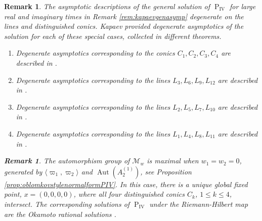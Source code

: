 \documentclass[a4paper,reqno]{amsart}
\numberwithin{equation}{section}
\newcommand{\pain}[1]{\operatorname{P}_{\mathrm{#1}}}
\DeclareMathOperator{\Aut}{Aut}
\newtheorem{remark}[theorem]{Remark}
\numberwithin{equation}{section}
\begin{document}
\begin{remark}
The asymptotic descriptions of the general solution of $\pain{IV}$ for large real and imaginary times in  Remark \ref{rem:kapaevgenasymp} degenerate on the lines and distinguished conics. Kapaev \cite{kapaev1996} provided degenerate asymptotics of the solution for each of these special cases, collected in different theorems.
\begin{enumerate}
    \item Degenerate asymptotics corresponding to the  conics $C_1,C_2,C_3,C_4$ are described in  \cite[Th. 6]{kapaev1996}.
    \item Degenerate asymptotics corresponding to the lines $L_3,L_6,L_9,L_{12}$ are described in  \cite[Th. 7]{kapaev1996}.
    \item Degenerate asymptotics corresponding to the lines $L_2,L_5,L_7,L_{10}$ are described in  \cite[Th. 8]{kapaev1996}.
    \item Degenerate asymptotics corresponding to the lines $L_1,L_4,L_8,L_{11}$ are described in  \cite[Th. 9]{kapaev1996}.
\end{enumerate}


\begin{remark}
The automorphism group of $\mathcal{M}_w$ is maximal when $w_1=w_2=0$, generated by $\langle\varpi_1,\varpi_2\rangle$ and $\Aut(A_2^{(1)})$, see Proposition \ref{prop:oblomkovstylenormalformPIV}. In this case, there is a unique global fixed point, $x=(0,0,0,0)$, where all four distinguished conics $C_k$, $1\leq k\leq 4$, intersect. The corresponding solutions of $\pain{IV}$ under the Riemann-Hilbert map are the Okamoto rational solutions \cites{kapaev1998,maro18}.
\end{remark}






\end{remark}
\end{document}
